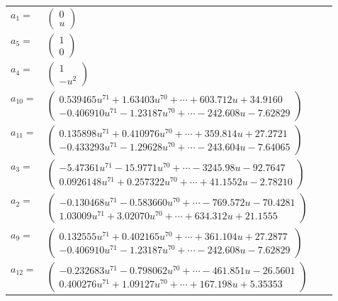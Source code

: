 \documentclass[1p]{elsarticle_modified}
\theoremstyle{definition}
\begin{document}
\begin{tabular}{m{7pt} m{180pt} m{7pt} m{180pt} }
\flushright $a_{1}=$&$\begin{pmatrix}0\\u\end{pmatrix}$ \\
\flushright $a_{5}=$&$\begin{pmatrix}1\\0\end{pmatrix}$ \\
\flushright $a_{4}=$&$\begin{pmatrix}1\\- u^2\end{pmatrix}$ \\
\flushright $a_{10}=$&$\begin{pmatrix}0.539465 u^{71}+1.63403 u^{70}+\cdots+603.712 u+34.9160\\-0.406910 u^{71}-1.23187 u^{70}+\cdots-242.608 u-7.62829\end{pmatrix}$ \\
\flushright $a_{11}=$&$\begin{pmatrix}0.135898 u^{71}+0.410976 u^{70}+\cdots+359.814 u+27.2721\\-0.433293 u^{71}-1.29628 u^{70}+\cdots-243.604 u-7.64065\end{pmatrix}$ \\
\flushright $a_{3}=$&$\begin{pmatrix}-5.47361 u^{71}-15.9771 u^{70}+\cdots-3245.98 u-92.7647\\0.0926148 u^{71}+0.257322 u^{70}+\cdots+41.1552 u-2.78210\end{pmatrix}$ \\
\flushright $a_{2}=$&$\begin{pmatrix}-0.130468 u^{71}-0.583660 u^{70}+\cdots-769.572 u-70.4281\\1.03009 u^{71}+3.02070 u^{70}+\cdots+634.312 u+21.1555\end{pmatrix}$ \\
\flushright $a_{9}=$&$\begin{pmatrix}0.132555 u^{71}+0.402165 u^{70}+\cdots+361.104 u+27.2877\\-0.406910 u^{71}-1.23187 u^{70}+\cdots-242.608 u-7.62829\end{pmatrix}$ \\
\flushright $a_{12}=$&$\begin{pmatrix}-0.232683 u^{71}-0.798062 u^{70}+\cdots-461.851 u-26.5601\\0.400276 u^{71}+1.09127 u^{70}+\cdots+167.198 u+5.35353\end{pmatrix}$ \\

\end{tabular}
\end{document}
